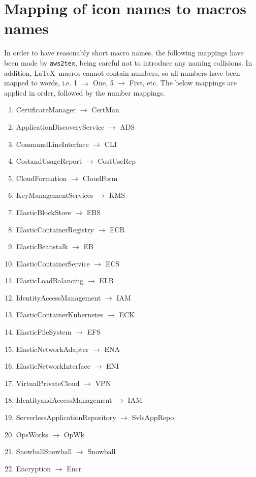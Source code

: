 \documentclass[12pt]{article}
\begin{document}
\section{Mapping of icon names to macros names}
In order to have reasonably short macro names, the following mappings have been made by \texttt{aws2tex}, being careful not to introduce any naming collisions.
In addition, \LaTeX\ macros cannot contain numbers, so all numbers have been mapped to words, i.e. 1 $\rightarrow$ One, 5 $\rightarrow$ Five, etc.
The below mappings are applied in order, followed by the number mappings.
{\tiny
\begin{multicols}{3}
  \begin{enumerate}
  \item  CertificateManager $\rightarrow$ CertMan
  \item  ApplicationDiscoveryService $\rightarrow$ ADS
  \item	CommandLineInterface $\rightarrow$  CLI
  \item	CostandUsageReport $\rightarrow$ CostUseRep
  \item	CloudFormation $\rightarrow$ CloudForm
  \item	KeyManagementServices $\rightarrow$ KMS
  \item	ElasticBlockStore $\rightarrow$ EBS
  \item	ElasticContainerRegistry $\rightarrow$ ECR
  \item	ElasticBeanstalk $\rightarrow$ EB
  \item	ElasticContainerService $\rightarrow$ ECS
  \item	ElasticLoadBalancing $\rightarrow$ ELB
  \item	IdentityAccessManagement $\rightarrow$ IAM
  \item	ElasticContainerKubernetes $\rightarrow$ ECK
  \item	ElasticFileSystem $\rightarrow$ EFS
  \item ElasticNetworkAdapter $\rightarrow$ ENA
  \item ElasticNetworkInterface $\rightarrow$ ENI
  \item	VirtualPrivateCloud $\rightarrow$ VPN
  \item	IdentityandAccessManagement $\rightarrow$ IAM
  \item	ServerlessApplicationRepository $\rightarrow$ SvlsAppRepo
  \item	OpsWorks $\rightarrow$ OpWk
  \item	SnowballSnowball $\rightarrow$ Snowball
  \item	Encryption $\rightarrow$ Encr

\end{enumerate}
\end{multicols}}
\end{document}
